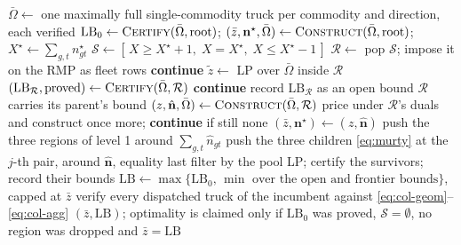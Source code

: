 \begin{algorithm}[!htb]
\caption{BP-3D-SCPTOP: branch and bound over the fleet vector, with
\textsc{Construct} as primal heuristic and \textsc{Certify} as bound.}
\label{alg:bp3d}
\begin{algorithmic}[1]
\State $\bar\Omega\gets$ one maximally full single-commodity truck per commodity
   and direction, each verified
\State $\mathrm{LB}_{0}\gets\textsc{Certify}(\bar\Omega,\text{root})$;
   $(\bar z,\mathbf{n}^{\star},\bar\Omega)\gets\textsc{Construct}(\bar\Omega,\text{root})$;
   $X^{\star}\gets\sum_{g,t}n^{\star}_{gt}$
\State $\mathcal{S}\gets[\,X\ge X^{\star}+1,\; X=X^{\star},\; X\le X^{\star}-1\,]$
   \State $\mathcal{R}\gets$ pop $\mathcal{S}$; impose it on the RMP as fleet rows
    \State \textbf{continue}
       \EndIf
   \State $\tilde z\gets$ LP over $\bar\Omega$ inside $\mathcal{R}$
      \State $(\mathrm{LB}_{\mathcal{R}},\text{proved})\gets
             \textsc{Certify}(\bar\Omega,\mathcal{R})$
       \State \textbf{continue}
          \EndIf
      \State record $\mathrm{LB}_{\mathcal{R}}$ as an open bound
   \Else \State $\mathcal{R}$ carries its parent's bound \EndIf
   \State $(z,\hat{\mathbf{n}},\bar\Omega)\gets\textsc{Construct}(\bar\Omega,\mathcal{R})$
    \State price under $\mathcal{R}$'s duals and construct once
      more; \textbf{continue} if still none \EndIf
    \State $(\bar z,\mathbf{n}^{\star})\gets(z,\hat{\mathbf{n}})$
       \EndIf
      \State push the three regions of level 1 around
            $\sum_{g,t}\hat n_{gt}$ 
      \State push the three children \eqref{eq:murty} at the $j$-th pair,
             around $\hat{\mathbf{n}}$, equality last
   \EndIf
\EndWhile
{}
   \State filter by the pool LP; certify the survivors; record their bounds
\EndFor
\State $\mathrm{LB}\gets\max\{\mathrm{LB}_{0},\,
   \min\text{ over the open and frontier bounds}\}$, capped at $\bar z$
\State verify every dispatched truck of the incumbent against
   \eqref{eq:col-geom}--\eqref{eq:col-agg}
\State \Return $(\bar z,\mathrm{LB})$; optimality is claimed only if
   $\mathrm{LB}_{0}$ was proved, $\mathcal{S}=\emptyset$, no region was
   dropped and $\bar z=\mathrm{LB}$
\end{algorithmic}
\end{algorithm}
